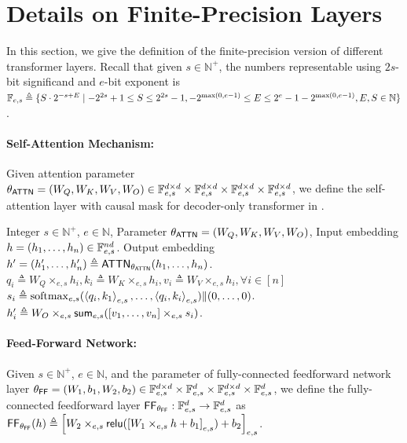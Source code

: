 \section{Details on Finite-Precision Layers}\label{appsec:finite_precision}

In this section, we give the definition of the finite-precision version of different transformer layers.  Recall that given $s\in\mathbb{N}^+$, the numbers representable using $2s$-bit significand and $e$-bit exponent is $\mathbb{F}_{e,s}\triangleq \{ S\cdot 2^{-s +E} \mid -2^{2s}+1\le S\le 2^{2s}-1, -2^{\max(0,e-1)}\le E\le 2^e -1 -2^{\max(0,e-1)}, E,S\in\mathbb{N} \}$.


\paragraph{Self-Attention Mechanism:} Given attention parameter $\theta_{\mathsf{ATTN}} = (W_Q,W_K,W_V,W_O)\in  \mathbb{F}_{e,s} ^{d\times d}\times  \mathbb{F}_{e,s} ^{d\times d}\times \mathbb{F}_{e,s} ^{d\times d}\times  \mathbb{F}_{e,s} ^{d\times d}$, we define the self-attention layer with causal mask for decoder-only transformer in .

\begin{algorithm}
\caption{Finite-Precision Causal Self-Attention, $\Attn$}\label{alg:defi_attn}
\begin{algorithmic}[1]
\Require  Integer $s\in\mathbb{N}^+$, $e\in\mathbb{N}$, Parameter $\theta_{\mathsf{ATTN}} = (W_Q,W_K,W_V,W_O)$, Input embedding $h= (h_1,\ldots, h_n)\in \mathbb{F}_{e,s} ^{nd}$.
\Ensure Output embedding $h'= (h'_1,\ldots, h'_n) \triangleq \mathsf{ATTN}_{\theta_{\mathsf{ATTN}}}(h_1,\ldots, h_n)$.
\State $q_i \triangleq W_Q \times_{e,s}  h_i, k_i \triangleq W_K \times_{e,s} h_i, v_i \triangleq W_V \times_{e,s} h_i, \forall i\in[n]$
\State $s_i \triangleq \mathrm{softmax}_{e,s}(\left\langle q_i,k_1 \right\rangle_{e,s},\ldots,\left\langle q_i,k_i \right\rangle_{e,s}) \| (0,\ldots, 0) $. 
\State $h'_i \triangleq W_O \times_{e,s} \mathsf{sum}_{e,s}(  [v_1,\ldots, v_n] \times_{e,s} s_i)$.
\end{algorithmic}
\end{algorithm}



\paragraph{Feed-Forward Network:} Given $s\in\mathbb{N}^+$, $e\in\mathbb{N}$, and the parameter of fully-connected feedforward network layer $\theta_{\mathsf{FF}} = (W_1,b_1,W_2,b_2)\in  \mathbb{F}_{e,s} ^{d\times d}\times  \mathbb{F}_{e,s} ^d \times  \mathbb{F}_{e,s} ^{d\times d}\times  \mathbb{F}_{e,s} ^d$, we define the fully-connected feedforward layer $\mathsf{FF}_{\theta_{\mathsf{FF}}}: \mathbb{F}_{e,s} ^d\to  \mathbb{F}_{e,s} ^d$ as $\mathsf{FF}_{\theta_{\mathsf{FF}}}(h) \triangleq \left[W_2\times_{e,s} \mathsf{relu}(\left[W_1 \times_{e,s} h + b_1\right]_{e,s}) + b_2\right]_{e,s}$.

